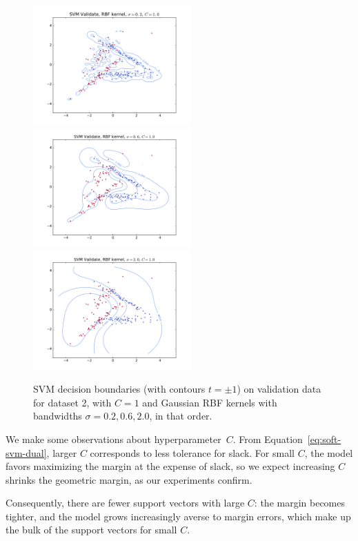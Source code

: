 \documentclass{article}
\begin{document}
\begin{multicols}{2}
\begin{figure}[t]
   \centering
   \includegraphics[width=2.4in]{img/p2-3-d2-c1-rbf02/validate.pdf}
   \includegraphics[width=2.4in]{img/p2-3-d2-c1-rbf06/validate.pdf}
   \includegraphics[width=2.4in]{img/p2-3-d2-c1-rbf20/validate.pdf}
   \caption{SVM decision boundaries (with contours $t = \pm1$) on validation data
   for dataset 2, with $C = 1$ and Gaussian RBF kernels
   with bandwidths $\sigma=0.2,0.6,2.0$, in that order.}
   \label{fig:2-3-gaussian-rbf}
\end{figure}

We make some observations about hyperparameter~$C$.
From Equation~\ref{eq:soft-svm-dual},
larger $C$ corresponds to less tolerance for slack.
For small $C$, the model favors
maximizing the margin at the expense of slack,
so we expect increasing $C$ shrinks the geometric margin,
as our experiments confirm.

Consequently, there are fewer support vectors with large $C$:
the margin becomes tighter,
and the model grows increasingly averse to margin errors,
which make up the bulk of the support vectors for small $C$.


\end{multicols}
\end{document}
